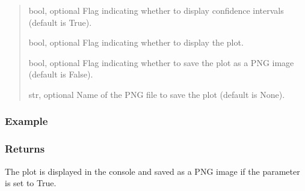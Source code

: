 \documentclass[a4paper,11pt,openany,english]{sphinxmanual}
\begin{document}
\begin{fulllineitems}
\begin{fulllineitems}
\begin{quote}
\begin{description}
\sphinxAtStartPar
bool, optional
Flag indicating whether to display confidence intervals (default is True).

\sphinxAtStartPar
bool, optional
Flag indicating whether to display the plot.

\sphinxAtStartPar
bool, optional
Flag indicating whether to save the plot as a PNG image (default is False).

\sphinxAtStartPar
str, optional
Name of the PNG file to save the plot (default is None).

\end{description}\end{quote}


\subsubsection{Example}
\label{\detokenize{api_topt:id80}}
\begin{sphinxVerbatim}[commandchars=\\\{\}]
  
 
   
\end{sphinxVerbatim}


\subsubsection{Returns}
\label{\detokenize{api_topt:id81}}\begin{description}
\sphinxAtStartPar
The plot is displayed in the console and saved as a PNG image if the  parameter is set to True.

\end{description}

\end{fulllineitems}


\end{fulllineitems}
\end{document}
